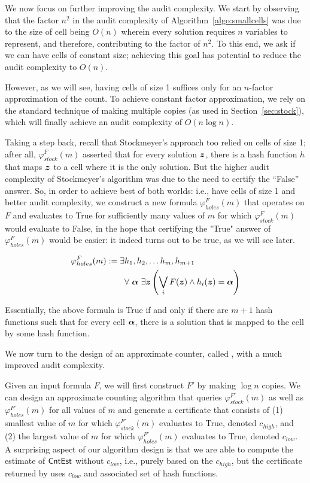 We now focus on further improving the audit complexity. We start by observing that the factor $n^2$ in the audit complexity of Algorithm~\ref{algo:smallcells} was due to the size of cell being $O(n)$ wherein every solution requires $n$ variables to represent, and therefore, contributing to the factor of $n^2$. To this end, we ask if we can have cells of constant size; achieving this goal has potential to reduce the audit complexity to $O(n)$.

However, as we will see, having cells of size 1 suffices only for an $n$-factor approximation of the count. To achieve constant factor approximation, we rely on the standard technique of making multiple copies (as used in Section~\ref{sec:stock}), which will finally achieve an audit complexity of $O(n \log n)$. 

Taking a step back, recall that Stockmeyer's approach too relied on cells of size 1; after all, $\varphi_{stock}^{F}(m) $ asserted that for every solution ${\boldsymbol{z}}$, there is a hash function $h$ that maps ${\boldsymbol{z}}$ to a cell where it is the only solution. But the higher audit complexity of Stockmeyer's algorithm was due to the need to certify the ``False'' answer. So, in order to achieve best of both worlds: i.e., have cells of size 1 and better audit complexity, we construct a new formula $\varphi_{holes}^{F}(m) $ that operates on $F$ and evaluates to True for sufficiently many values of $m$ for which $\varphi_{stock}^{F}(m)$ would evaluate to False, in the hope that certifying the "True" answer of $\varphi_{holes}^{F}(m)$ would be easier: it indeed turns out to be true, as we will see later. 


\begin{align*}
	\varphi_{holes}^{F}(m) :=  \exists &h_1, h_2, \ldots h_{m},h_{m+1} \\ 
	&\forall \,\, {\boldsymbol{\alpha}} \,\, \exists {\boldsymbol{z}}  \left(\bigvee_{i} F({\boldsymbol{z}}) \wedge h_i({\boldsymbol{z}}) = {\boldsymbol{\alpha}} \right)	
\end{align*}

Essentially, the above formula is True if and only if there are $m+1$ hash functions such that for
every cell ${\boldsymbol{\alpha}}$, there is a solution that is mapped to the cell by some hash function.  



We now turn to the design of an approximate counter, called {\toolname}, with a much improved audit complexity. 

Given an input formula $F$, we will first construct $F'$ by making $\log n$ copies. We can design an approximate counting algorithm that queries $\varphi_{stock}^{F'}(m)$ as well as $\varphi_{holes}^{F'}(m)$ for all values of $m$ and generate a certificate that consists of (1) smallest value of $m$ for which $\varphi_{stock}^{F'}(m)$  evaluates to True, denoted $c_{high}$, and (2) the largest value of $m$ for which $\varphi_{holes}^{F'}(m)$ evaluates to True, denoted $c_{low}$. A surprising aspect of our algorithm design is that we are able to compute the estimate of $\mathsf{CntEst}$ without $c_{low}$, i.e., purely based on the $c_{high}$, but the certificate returned by {\toolname} uses $c_{low}$ and associated set of hash functions. 


